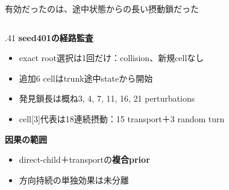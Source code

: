 \documentclass[aspectratio=169,10pt]{beamer}
\begin{document}
\begin{frame}{有効だったのは、途中状態からの長い摂動鎖だった}
\begin{columns}[T,totalwidth=\textwidth]
    \begin{column}{.41\textwidth}
      \textbf{seed401の経路監査}
      \begin{itemize}\setlength\itemsep{0.08cm}
        \item exact root選択は1回だけ：collision、新規cellなし
        \item 追加6 cellはtrunk途中stateから開始
        \item 発見鎖長は概ね3, 4, 7, 11, 16, 21 perturbations
        \item cell[3]代表は18連続摂動：15 transport＋3 random turn
      \end{itemize}
      \vspace{0.00cm}
      \textbf{因果の範囲}
      \begin{itemize}\setlength\itemsep{0.02cm}
        \item direct-child＋transportの\textbf{複合prior}
        \item 方向持続の単独効果は未分離
      \end{itemize}
    \end{column}
  \end{columns}
\end{frame}
\end{document}
